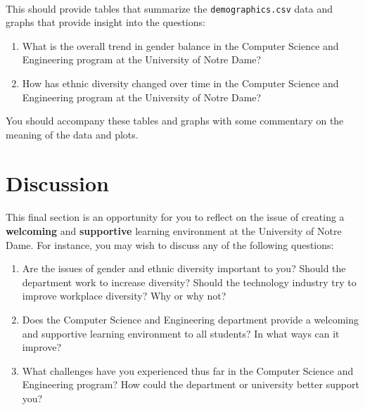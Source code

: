 \documentclass[letterpaper]{article}
\begin{document}

\paragraph{}

This should provide tables that summarize the {\tt demographics.csv} data and
graphs that provide insight into the questions:


\begin{enumerate}

\item{}What is the overall trend in gender balance in the Computer Science and
    Engineering program at the University of Notre Dame?

\item{}How has ethnic diversity changed over time in the Computer Science and
    Engineering program at the University of Notre Dame?

\end{enumerate}


You should accompany these tables and graphs with some commentary on the
meaning of the data and plots.

\paragraph{}


\section*{Discussion}

\paragraph{}

This final section is an opportunity for you to reflect on the issue of
creating a {\bf welcoming} and {\bf supportive} learning environment at the
University of Notre Dame. For instance, you may wish to discuss any of the
following questions:

\begin{enumerate}

\item{}Are the issues of gender and ethnic diversity important to you? Should
    the department work to increase diversity? Should the technology industry
    	try to improve workplace diversity? Why or why not?

\item{}Does the Computer Science and Engineering department provide a welcoming
    and supportive learning environment to all students? In what ways can it
    	improve?

\item{}What challenges have you experienced thus far in the Computer Science
    and Engineering program? How could the department or university better
    	support you?

\end{enumerate}
\end{document}
